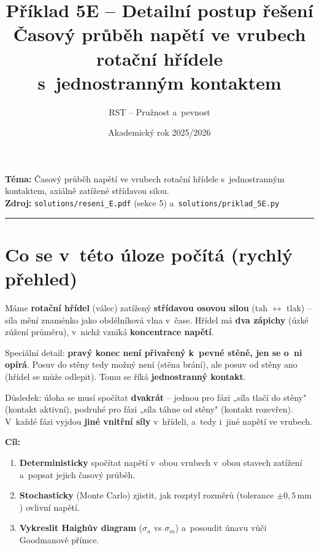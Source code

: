 \documentclass[a4paper,11pt]{article}
\title{\textbf{Příklad 5E -- Detailní postup řešení}\\
       \large Časový průběh napětí ve vrubech rotační hřídele\\
       s~jednostranným kontaktem}
\author{RST -- Pružnost a~pevnost}
\date{Akademický rok 2025/2026}
\newcommand{\unit}[1]{\,\mathrm{#1}}
\begin{document}
\maketitle

\noindent\textbf{Téma:} Časový průběh napětí ve vrubech rotační hřídele s~jednostranným kontaktem, axiálně zatížené střídavou silou.\\
\textbf{Zdroj:} \texttt{solutions/reseni\_E.pdf} (sekce 5) a~\texttt{solutions/priklad\_5E.py}

\tableofcontents
\vspace{1em}

\hrule
\vspace{1em}

\section{Co se v~této úloze počítá (rychlý přehled)}

Máme \textbf{rotační hřídel} (válec) zatížený \textbf{střídavou osovou silou} (tah $\leftrightarrow$ tlak) -- síla mění znaménko jako obdélníková vlna v~čase. Hřídel má \textbf{dva zápichy} (úzké zúžení průměru), v~nichž vzniká \textbf{koncentrace napětí}.

Speciální detail: \textbf{pravý konec není přivařený k~pevné stěně, jen se o~ni opírá}. Posuv do stěny tedy možný není (stěna brání), ale posuv od stěny ano (hřídel se může odlepit). Tomu se říká \textbf{jednostranný kontakt}.

Důsledek: úloha se musí spočítat \textbf{dvakrát} -- jednou pro fázi „síla tlačí do stěny" (kontakt aktivní), podruhé pro fázi „síla táhne od stěny" (kontakt rozevřen). V~každé fázi vyjdou \textbf{jiné vnitřní síly} v~hřídeli, a~tedy i~jiné napětí ve vrubech.

\textbf{Cíl:}
\begin{enumerate}[nosep]
    \item \textbf{Deterministicky} spočítat napětí v~obou vrubech v~obou stavech zatížení a~popsat jejich časový průběh.
    \item \textbf{Stochasticky} (Monte Carlo) zjistit, jak rozptyl rozměrů (tolerance $\pm 0{,}5\unit{mm}$) ovlivní napětí.
    \item \textbf{Vykreslit Haighův diagram} ($\sigma_a$ vs $\sigma_m$) a~posoudit únavu vůči Goodmanově přímce.
\end{enumerate}

\end{document}
